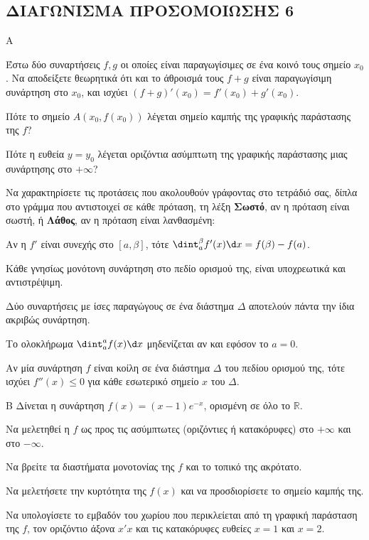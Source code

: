 \subsection{ΔΙΑΓΩΝΙΣΜΑ ΠΡΟΣΟΜΟΙΩΣΗΣ 6}
\begin{thema}{Α}
\begin{erwthma}
    \item Έστω δύο συναρτήσεις $f, g$ οι οποίες είναι παραγωγίσιμες σε ένα κοινό τους σημείο $x_0$. Να αποδείξετε θεωρητικά ότι και το άθροισμά τους $f + g$ είναι παραγωγίσιμη συνάρτηση στο $x_0$, και ισχύει $(f + g)'(x_0) = f'(x_0) + g'(x_0)$. 
    \item Πότε το σημείο $A(x_0, f(x_0))$ λέγεται σημείο καμπής της γραφικής παράστασης της $f$? 
    \item Πότε η ευθεία $y = y_0$ λέγεται οριζόντια ασύμπτωτη της γραφικής παράστασης μιας συνάρτησης στο $+\infty$? 
    \item Να χαρακτηρίσετε τις προτάσεις που ακολουθούν γράφοντας στο τετράδιό σας, δίπλα στο γράμμα που αντιστοιχεί σε κάθε πρόταση, τη λέξη \textbf{Σωστό},
αν η πρόταση είναι σωστή, ή \textbf{Λάθος}, αν η πρόταση είναι λανθασμένη:
    \begin{alist}
        \item Αν η $f'$ είναι συνεχής στο $[a, \beta]$, τότε $\dint_a^\beta f'(x) \d x = f(\beta) - f(a)$.
        \item Κάθε γνησίως μονότονη συνάρτηση στο πεδίο ορισμού της, είναι υποχρεωτικά και αντιστρέψιμη.
        \item Δύο συναρτήσεις με ίσες παραγώγους σε ένα διάστημα $\Delta$ αποτελούν πάντα την ίδια ακριβώς συνάρτηση.
        \item Το ολοκλήρωμα $\dint_a^a f(x) \d x$ μηδενίζεται αν και εφόσον το $a = 0$.
        \item Αν μία συνάρτηση $f$ είναι κοίλη σε ένα διάστημα $\varDelta$ του πεδίου ορισμού της, τότε ισχύει $f''(x)\leq 0$ για κάθε εσωτερικό σημείο $x$ του $\varDelta$.
    \end{alist} 
\end{erwthma}
\end{thema}

\begin{thema}{Β}
Δίνεται η συνάρτηση $f(x) = (x-1)e^{-x}$, ορισμένη σε όλο το $\mathbb{R}$.
\begin{erwthma}
    \item Να μελετηθεί η $f$ ως προς τις ασύμπτωτες (οριζόντιες ή κατακόρυφες) στο $+\infty$ και στο $-\infty$. 
    \item Να βρείτε τα διαστήματα μονοτονίας της $f$ και το τοπικό της ακρότατο. 
    \item Να μελετήσετε την κυρτότητα της $f(x)$ και να προσδιορίσετε το σημείο καμπής της. 
    \item Να υπολογίσετε το εμβαδόν του χωρίου που περικλείεται από τη γραφική παράσταση της $f$, τον οριζόντιο άξονα $x'x$ και τις κατακόρυφες ευθείες $x=1$ και $x=2$. 
\end{erwthma}
\end{thema}

